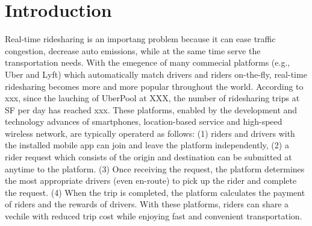\section{Introduction}

%	
%	
%	
%	
%	


Real-time ridesharing is an importang problem because it can ease traffic congestion, decrease auto emissions, while at the same time serve the transportation needs. With the emegence of many commecial platforms (e.g., Uber and Lyft) which automatically match drivers and riders on-the-fly, real-time ridesharing becomes more and more popular throughout the world. According to xxx, since the lauching of UberPool at XXX, the number of ridesharing trips at SF per day has reached xxx. These platforms, enabled by the development and technology advances of smartphones, location-based service and high-speed wireless network, are typically operaterd as follows: (1) riders and drivers with the installed mobile app can join and leave the platform independently, (2) a rider request which consists of the origin and destination can be submitted at anytime to the platform. (3) Once receiving the request, the platform determines the most appropriate drivers (even en-route) to pick up the rider and complete the request. (4) When the trip is completed, the platform calculates the payment of riders and the rewards of drivers. With these platforms, riders can share a vechile with reduced trip cost while  enjoying fast and convenient transportation.


